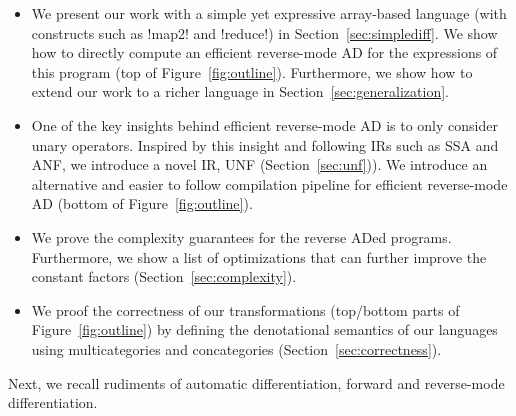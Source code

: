 \begin{itemize}[leftmargin=*]
\item We present our work with a simple yet expressive array-based language (with constructs such as !map2! and !reduce!) in Section~\ref{sec:simplediff}. 
We show how to directly compute an efficient reverse-mode AD for the expressions of this program (top of Figure~\ref{fig:outline}).  
Furthermore, we show how to extend our work to a richer language in Section~\ref{sec:generalization}.
\item One of the key insights behind efficient reverse-mode AD is to only consider unary operators. 
Inspired by this insight and following IRs such as SSA and ANF, we introduce a novel IR, UNF (Section~\ref{sec:unf})).
We introduce an alternative and easier to follow compilation pipeline for efficient reverse-mode AD (bottom of Figure~\ref{fig:outline}).
\item We prove the complexity guarantees for the reverse ADed programs. Furthermore, we show a list of optimizations that can further improve the constant factors (Section~\ref{sec:complexity}).
\item We proof the correctness of our transformations (top/bottom parts of Figure~\ref{fig:outline}) by defining the denotational semantics of our languages using multicategories and concategories (Section~\ref{sec:correctness}).
\end{itemize}

Next, we recall rudiments of automatic differentiation, forward and reverse-mode differentiation.





